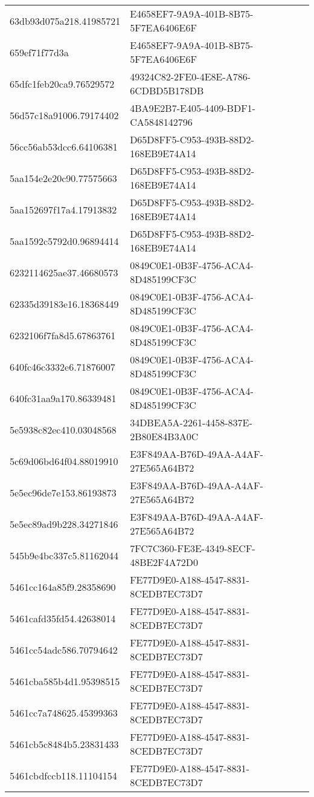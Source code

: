 \begin{tabular}{ll}
63db93d075a218.41985721 & E4658EF7-9A9A-401B-8B75-5F7EA6406E6F \\
659ef71f77d3a & E4658EF7-9A9A-401B-8B75-5F7EA6406E6F \\
65dfc1feb20ca9.76529572 & 49324C82-2FE0-4E8E-A786-6CDBD5B178DB \\
56d57c18a91006.79174402 & 4BA9E2B7-E405-4409-BDF1-CA5848142796 \\
56cc56ab53dcc6.64106381 & D65D8FF5-C953-493B-88D2-168EB9E74A14 \\
5aa154e2e20c90.77575663 & D65D8FF5-C953-493B-88D2-168EB9E74A14 \\
5aa152697f17a4.17913832 & D65D8FF5-C953-493B-88D2-168EB9E74A14 \\
5aa1592c5792d0.96894414 & D65D8FF5-C953-493B-88D2-168EB9E74A14 \\
6232114625ae37.46680573 & 0849C0E1-0B3F-4756-ACA4-8D485199CF3C \\
62335d39183e16.18368449 & 0849C0E1-0B3F-4756-ACA4-8D485199CF3C \\
6232106f7fa8d5.67863761 & 0849C0E1-0B3F-4756-ACA4-8D485199CF3C \\
640fc46c3332e6.71876007 & 0849C0E1-0B3F-4756-ACA4-8D485199CF3C \\
640fc31aa9a170.86339481 & 0849C0E1-0B3F-4756-ACA4-8D485199CF3C \\
5e5938c82ec410.03048568 & 34DBEA5A-2261-4458-837E-2B80E84B3A0C \\
5c69d06bd64f04.88019910 & E3F849AA-B76D-49AA-A4AF-27E565A64B72 \\
5e5ec96de7e153.86193873 & E3F849AA-B76D-49AA-A4AF-27E565A64B72 \\
5e5ec89ad9b228.34271846 & E3F849AA-B76D-49AA-A4AF-27E565A64B72 \\
545b9e4bc337c5.81162044 & 7FC7C360-FE3E-4349-8ECF-48BE2F4A72D0 \\
5461cc164a85f9.28358690 & FE77D9E0-A188-4547-8831-8CEDB7EC73D7 \\
5461cafd35fd54.42638014 & FE77D9E0-A188-4547-8831-8CEDB7EC73D7 \\
5461cc54adc586.70794642 & FE77D9E0-A188-4547-8831-8CEDB7EC73D7 \\
5461cba585b4d1.95398515 & FE77D9E0-A188-4547-8831-8CEDB7EC73D7 \\
5461cc7a748625.45399363 & FE77D9E0-A188-4547-8831-8CEDB7EC73D7 \\
5461cb5c8484b5.23831433 & FE77D9E0-A188-4547-8831-8CEDB7EC73D7 \\
5461cbdfccb118.11104154 & FE77D9E0-A188-4547-8831-8CEDB7EC73D7 \\

\end{tabular}
